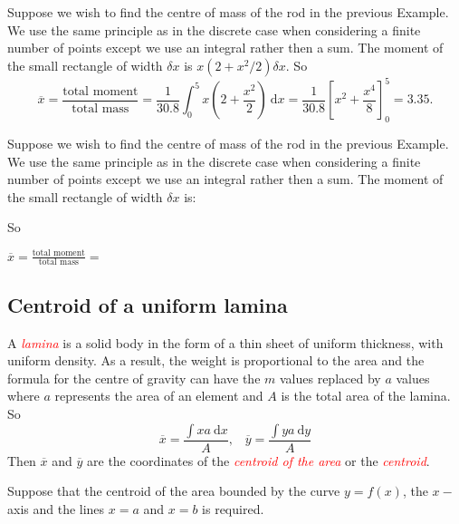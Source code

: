 \documentclass[
  11pt,
  oneside]{book}
\newcommand{\slide}{}
\theoremstyle{definition}
\theoremstyle{definition}
\theoremstyle{definition}
\theoremstyle{definition}
\theoremstyle{remark}
\begin{document}
\slide

\begin{notslides}

Suppose we wish to find the centre of mass of the rod in the previous Example. We use the same principle as in the discrete case when considering a finite number of points except we use an integral rather then a sum. The moment of the small rectangle of width \(\delta x\) is \(x(2+x^2/2)\delta x\). So
\[
\overline x = \frac{\text{total moment}}{\text{total mass}} = \frac{1}{30.8}\int_0^5 x(2+\frac{x^2}{2})\ \mathrm{d}x = \frac{1}{30.8}\left[x^2+\frac{x^4}{8}\right]_0^5 = 3.35.
\]

\end{notslides}

\begin{slidesonly}

Suppose we wish to find the centre of mass of the rod in the previous Example. We use the same principle as in the discrete case when considering a finite number of points except we use an integral rather then a sum. The moment of the small rectangle of width \(\delta x\) is:

So

\(\overline x = \displaystyle\frac{\text{total moment}}{\text{total mass}} =\)

\end{slidesonly}

\slide

\subsection{Centroid of a uniform lamina}\label{centroid-of-a-uniform-lamina}

A \textcolor{red}{\em lamina} is a solid body in the form of a thin sheet of uniform thickness, with uniform density. As a result, the weight is proportional to the area and the formula for the centre of gravity can have the \(m\) values replaced by \(a\) values where \(a\) represents the area of an element and \(A\) is the total area of the lamina. So
\[
\overline x = \frac{\displaystyle\int xa\ \mathrm{d}x}{A},\;\;\; \overline y = \frac{\displaystyle\int ya\ \mathrm{d}y}{A}
\]
Then \(\overline x\) and \(\overline y\) are the coordinates of the \textcolor{red}{\em centroid of the area} or the \textcolor{red}{\em centroid}.

\slide

Suppose that the centroid of the area bounded by the curve \(y=f(x)\), the \(x-\)axis and the lines \(x=a\) and \(x=b\) is required.
\end{document}
